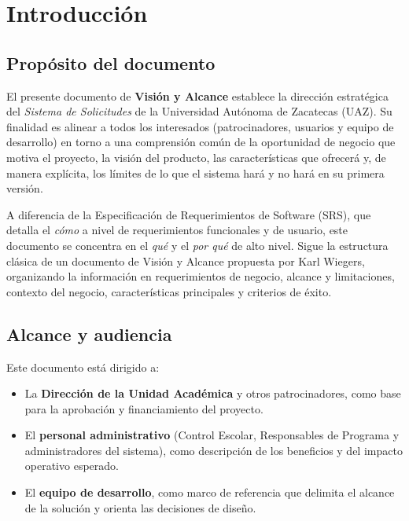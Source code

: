 \documentclass[12pt,letterpaper]{report}
\begin{document}
\tableofcontents\newpage

\chapter{Introducción}

\section{Propósito del documento}

El presente documento de \textbf{Visión y Alcance} establece la dirección estratégica del \textit{Sistema de Solicitudes} de la Universidad Autónoma de Zacatecas (UAZ). Su finalidad es alinear a todos los interesados (patrocinadores, usuarios y equipo de desarrollo) en torno a una comprensión común de la oportunidad de negocio que motiva el proyecto, la visión del producto, las características que ofrecerá y, de manera explícita, los límites de lo que el sistema hará y no hará en su primera versión.

A diferencia de la Especificación de Requerimientos de Software (SRS), que detalla el \emph{cómo} a nivel de requerimientos funcionales y de usuario, este documento se concentra en el \emph{qué} y el \emph{por qué} de alto nivel. Sigue la estructura clásica de un documento de Visión y Alcance propuesta por Karl Wiegers, organizando la información en requerimientos de negocio, alcance y limitaciones, contexto del negocio, características principales y criterios de éxito.

\section{Alcance y audiencia}

Este documento está dirigido a:

\begin{itemize}
    \item La \textbf{Dirección de la Unidad Académica} y otros patrocinadores, como base para la aprobación y financiamiento del proyecto.
    \item El \textbf{personal administrativo} (Control Escolar, Responsables de Programa y administradores del sistema), como descripción de los beneficios y del impacto operativo esperado.
    \item El \textbf{equipo de desarrollo}, como marco de referencia que delimita el alcance de la solución y orienta las decisiones de diseño.
\end{itemize}
\end{document}
